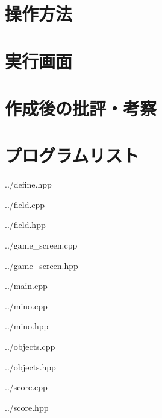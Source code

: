 \documentclass[11pt,a4paper]{jsarticle}
\begin{document}
  \section{操作方法}
    
  \clearpage
  \section{実行画面}
    
  \clearpage
  \section{作成後の批評・考察}
    
  \clearpage
  \section{プログラムリスト}
    
    {../define.hpp}
    
    {../field.cpp}
    
    {../field.hpp}
    
    {../game_screen.cpp}
    
    {../game_screen.hpp}
    
    {../main.cpp}
    
    {../mino.cpp}
    
    {../mino.hpp}
    
    {../objects.cpp}
    
    {../objects.hpp}
    
    {../score.cpp}
    
    {../score.hpp}
\end{document}
